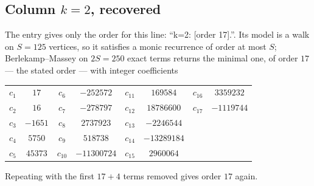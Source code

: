 \documentclass[11pt,a4paper]{article}
\theoremstyle{plain}
\theoremstyle{definition}
\begin{document}
\subsection*{Column $k=2$, recovered}
The entry gives only the order for this line: ``k=2: [order 17].''. Its model is a walk on
$S=125$ vertices, so it satisfies a monic recurrence of order at most $S$;
Berlekamp--Massey on $2S=250$ exact terms returns the minimal one, of order
$17$ --- the stated order --- with integer coefficients
\begin{center}\small\begin{tabular}{cccccccc}
$c_{1}$ & $17$ & $c_{6}$ & $-252572$ & $c_{11}$ & $169584$ & $c_{16}$ & $3359232$ \\
$c_{2}$ & $16$ & $c_{7}$ & $-278797$ & $c_{12}$ & $18786600$ & $c_{17}$ & $-1119744$ \\
$c_{3}$ & $-1651$ & $c_{8}$ & $2737923$ & $c_{13}$ & $-2246544$ &  &  \\
$c_{4}$ & $5750$ & $c_{9}$ & $518738$ & $c_{14}$ & $-13289184$ &  &  \\
$c_{5}$ & $45373$ & $c_{10}$ & $-11300724$ & $c_{15}$ & $2960064$ &  &  \\
\end{tabular}\end{center}
Repeating with the first $17+4$ terms removed gives order $17$ again.
\end{document}
